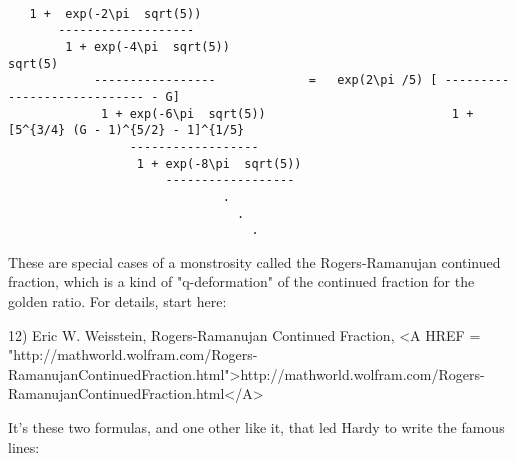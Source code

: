     

\begin{verbatim}

   1 +  exp(-2\pi  sqrt(5))
       -------------------
        1 + exp(-4\pi  sqrt(5))                                         sqrt(5)
            -----------------             =   exp(2\pi /5) [ ---------------------------- - G]
             1 + exp(-6\pi  sqrt(5))                          1 + [5^{3/4} (G - 1)^{5/2} - 1]^{1/5}
                 ------------------
                  1 + exp(-8\pi  sqrt(5))  
                      ------------------   
                              .
                                .
                                  .

\end{verbatim}
    
These are special cases of a monstrosity called the Rogers-Ramanujan
continued fraction, which is a kind of "q-deformation" of 
the continued fraction for the golden ratio.  For details, start here:

12) Eric W. Weisstein, Rogers-Ramanujan Continued Fraction,
<A HREF = "http://mathworld.wolfram.com/Rogers-RamanujanContinuedFraction.html">http://mathworld.wolfram.com/Rogers-RamanujanContinuedFraction.html</A> 

It's these two formulas, and one other like it, that led
Hardy to write the famous lines:

